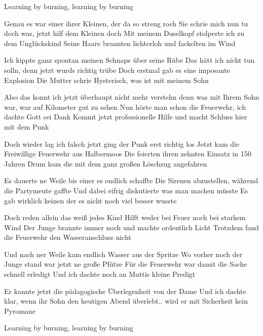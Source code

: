 \begin{guitar}
Learning by burning, learning by burning



Genau es war einer ihrer Kleinen, der da so streng roch
Sie schrie mich nun tu doch was, jetzt hilf dem Kleinen doch
Mit meinem Duselkopf stolperte ich zu dem Unglückskind
Seine Haare brannten lichterloh und fackelten im Wind

Ich kippte ganz spontan meinen Schnaps über seine Rübe
Das hätt ich nicht tun solln, denn jetzt wurds richtig trübe
Doch erstmal gab es eine imposante Explosion
Die Mutter schrie Hysterisch, was ist mit meinem Sohn

Also das konnt ich jetzt überhaupt nicht mehr verstehn
denn was mit Ihrem Sohn war, war auf Kilometer gut zu sehen
Nun hörte man schon die Feuerwehr, ich dachte Gott sei Dank
Kommt jetzt professionelle Hilfe und macht Schluss hier mit dem Punk

\pagebreak
Doch wieder lag ich falsch jetzt ging der Punk erst richtig los
Jetzt kam die Freiwillige Feuerwehr aus Halbermoos
Die feierten ihren zehnten Einsatz in 150 Jahren
Drum kam die mit dem ganz großen Löschzug angefahren

Es dauerte ne Weile bis einer es endlich schaffte
Die Sirenen abzustellen, während die Partymeute gaffte
Und dabei eifrig diskutierte was man machen müsste
Es gab wirklich keinen der es nicht noch viel besser wusste

Doch reden allein das weiß jedes Kind
Hilft weder bei Feuer noch bei starkem Wind
Der Junge brannte immer noch und machte ordentlich Licht
Trotzdem fand die Feuerwehr den Wasseranschluss nicht

Und nach ner Weile kam endlich Wasser aus der Spritze
Wo vorher noch der Junge stand war jetzt ne große Pfütze
Für die Feuerwehr war damit die Sache schnell erledigt
Und ich dachte noch an Muttis kleine Predigt

Er kannte jetzt die pädagogische Überlegenheit von der Dame
Und ich dachte klar, wenn ihr Sohn den heutigen Abend überlebt.. 
wird er mit Sicherheit kein Pyromane



Learning by burning, learning by burning 

\end{guitar}
